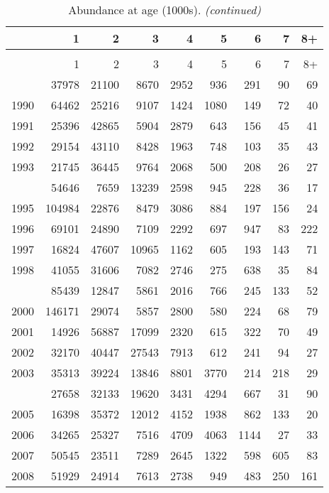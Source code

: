 \documentclass[
]{article}
\begin{document}
\begin{longtable}[t]{lrrrrrrrr}
\caption{\label{tab:NAA-table}Abundance at age (1000s).}\\
\toprule
  & 1 & 2 & 3 & 4 & 5 & 6 & 7 & 8+\\
\midrule
\endfirsthead
\caption[]{Abundance at age (1000s). \textit{(continued)}}\\
\toprule
  & 1 & 2 & 3 & 4 & 5 & 6 & 7 & 8+\\
\midrule
\endhead

\endfoot
\bottomrule
\endlastfoot
1989 & 37978 & 21100 & 8670 & 2952 & 936 & 291 & 90 & 69\\
1990 & 64462 & 25216 & 9107 & 1424 & 1080 & 149 & 72 & 40\\
1991 & 25396 & 42865 & 5904 & 2879 & 643 & 156 & 45 & 41\\
1992 & 29154 & 43110 & 8428 & 1963 & 748 & 103 & 35 & 43\\
1993 & 21745 & 36445 & 9764 & 2068 & 500 & 208 & 26 & 27\\
\addlinespace
1994 & 54646 & 7659 & 13239 & 2598 & 945 & 228 & 36 & 17\\
1995 & 104984 & 22876 & 8479 & 3086 & 884 & 197 & 156 & 24\\
1996 & 69101 & 24890 & 7109 & 2292 & 697 & 947 & 83 & 222\\
1997 & 16824 & 47607 & 10965 & 1162 & 605 & 193 & 143 & 71\\
1998 & 41055 & 31606 & 7082 & 2746 & 275 & 638 & 35 & 84\\
\addlinespace
1999 & 85439 & 12847 & 5861 & 2016 & 766 & 245 & 133 & 52\\
2000 & 146171 & 29074 & 5857 & 2800 & 580 & 224 & 68 & 79\\
2001 & 14926 & 56887 & 17099 & 2320 & 615 & 322 & 70 & 49\\
2002 & 32170 & 40447 & 27543 & 7913 & 612 & 241 & 94 & 27\\
2003 & 35313 & 39224 & 13846 & 8801 & 3770 & 214 & 218 & 29\\
\addlinespace
2004 & 27658 & 32133 & 19620 & 3431 & 4294 & 667 & 31 & 90\\
2005 & 16398 & 35372 & 12012 & 4152 & 1938 & 862 & 133 & 20\\
2006 & 34265 & 25327 & 7516 & 4709 & 4063 & 1144 & 27 & 33\\
2007 & 50545 & 23511 & 7289 & 2645 & 1322 & 598 & 605 & 83\\
2008 & 51929 & 24914 & 7613 & 2738 & 949 & 483 & 250 & 161\\

\end{longtable}
\end{document}
